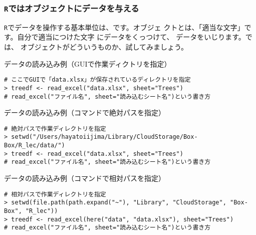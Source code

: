     \subsubsection{\texttt{R}ではオブジェクトにデータを与える}
\texttt{R}でデータを操作する基本単位は、です。オブジェ
クトとは、「適当な文字」です。自分で適当につけた文字
にデータをくっつけて、
データをいじります。では、
オブジェクトがどういうものか、試してみましょう。

\begin{itembox}[l]{データの読み込み例（GUIで作業ディクトリを指定）}
 \begin{verbatim}
# ここでGUIで「data.xlsx」が保存されているディレクトリを指定
> treedf <- read_excel("data.xlsx", sheet="Trees")
# read_excel("ファイル名", sheet="読み込むシート名")という書き方
\end{verbatim}
\end{itembox}

\begin{itembox}[l]{データの読み込み例（コマンドで絶対パスを指定）}
 \begin{verbatim}
# 絶対パスで作業ディレクトリを指定
> setwd("/Users/hayatoiijima/Library/CloudStorage/Box-Box/R_lec/data/")
> treedf <- read_excel("data.xlsx", sheet="Trees")
# read_excel("ファイル名", sheet="読み込むシート名")という書き方
\end{verbatim}
\end{itembox}

\begin{itembox}[l]{データの読み込み例（コマンドで相対パスを指定）}
 \begin{verbatim}
# 相対パスで作業ディレクトリを指定
> setwd(file.path(path.expand("~"), "Library", "CloudStorage", "Box-Box", "R_lec"))
> treedf <- read_excel(here("data", "data.xlsx"), sheet="Trees")
# read_excel("ファイル名", sheet="読み込むシート名")という書き方
\end{verbatim}
\end{itembox}

